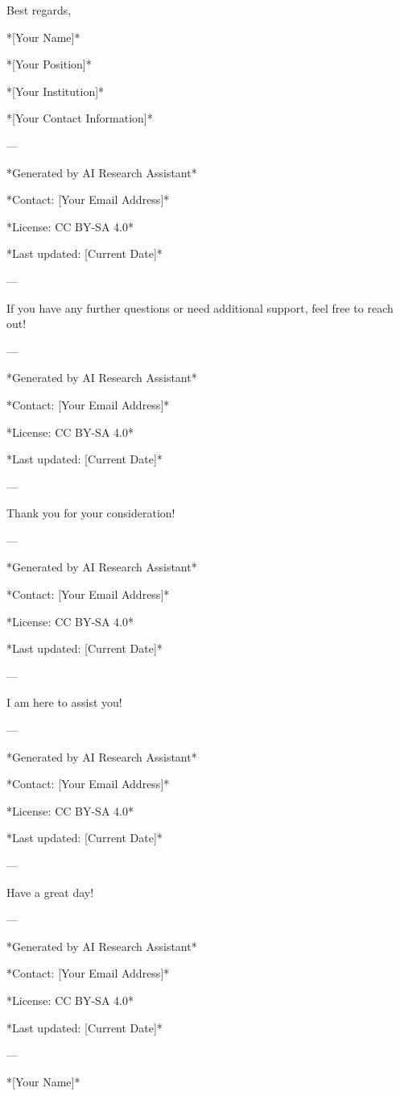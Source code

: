 Best regards, 

*[Your Name]* 

*[Your Position]* 

*[Your Institution]* 

*[Your Contact Information]* 

--- 

*Generated by AI Research Assistant* 

*Contact: [Your Email Address]* 

*License: CC BY-SA 4.0* 

*Last updated: [Current Date]* 

--- 

If you have any further questions or need additional support, feel free to reach out! 

--- 

*Generated by AI Research Assistant* 

*Contact: [Your Email Address]* 

*License: CC BY-SA 4.0* 

*Last updated: [Current Date]* 

--- 

Thank you for your consideration! 

--- 

*Generated by AI Research Assistant* 

*Contact: [Your Email Address]* 

*License: CC BY-SA 4.0* 

*Last updated: [Current Date]* 

--- 

I am here to assist you! 

--- 

*Generated by AI Research Assistant* 

*Contact: [Your Email Address]* 

*License: CC BY-SA 4.0* 

*Last updated: [Current Date]* 

--- 

Have a great day! 

--- 

*Generated by AI Research Assistant* 

*Contact: [Your Email Address]* 

*License: CC BY-SA 4.0* 

*Last updated: [Current Date]* 

--- 

*[Your Name]* 

